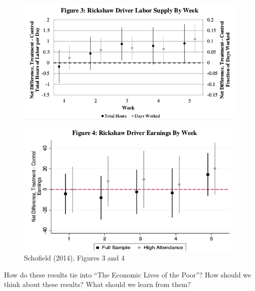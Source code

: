 \documentclass[12pt,english]{article}
\begin{document}
\begin{figure}[H]
	\begin{center}
		\begin{adjustbox}{
				max width=\textwidth,
			}
			\includegraphics{schofieldfig3.png}
		\end{adjustbox}
		\begin{adjustbox}{
				max width=\textwidth,
			}
			\includegraphics{schofieldfig4.png}
		\end{adjustbox} \\
		Schofield (2014), Figures 3 and 4
	\end{center}
\end{figure}

How do these results tie into ``The Economic Lives of the Poor''? How should we think about these results? What should we learn from them?
\end{document}
